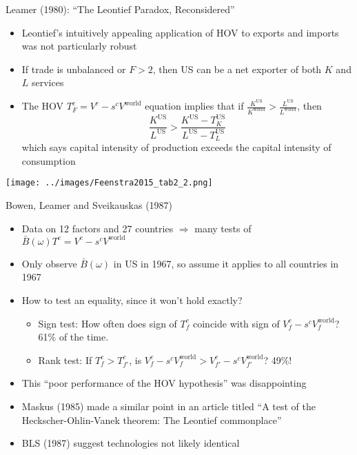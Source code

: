 \documentclass[10pt,notes=hide]{beamer}
\begin{document}
\begin{frame}{Leamer (1980): ``The Leontief Paradox, Reconsidered''}
\begin{itemize}
	\item Leontief's intuitively appealing application of HOV to exports and imports was not particularly robust
	\item If trade is unbalanced or $F>2$, then US can be a net exporter of both $K$ and $L$ services
	\item The HOV $T_{F}^{c} = V^c - s^c V^{\text{world}}$ equation implies that
	if $\frac{K^{\text{US}}}{K^{\text{world}}} > \frac{L^{\text{US}}}{L^{\text{world}}}$, then
	\begin{equation*}
		\frac{K^{\text{US}}}{L^{\text{US}}} > \frac{K^{\text{US}} - T_K^{\text{US}}}{L^{\text{US}} - T_L^{\text{US}}} 
	\end{equation*}
	which says capital intensity of production exceeds the capital intensity of consumption
\end{itemize}
\texttt{[image: ../images/Feenstra2015\_tab2\_2.png]}
\end{frame}
\begin{frame}{Bowen, Leamer and Sveikauskas (1987)}
\begin{itemize}
	\item Data on 12 factors and 27 countries $\Rightarrow$ many tests of $\bar{B}(\omega) T^c  = V^c - s^c V^{\text{world}}$
	\item Only observe $\bar{B}(\omega)$ in US in 1967, so assume it applies to all countries in 1967
	\item How to test an equality, since it won't hold exactly?
	\begin{itemize}
		\item Sign test: How often does sign of $T_{f}^{c}$ coincide with sign of $V_f^c - s^c V_f^{\text{world}}$? 61\% of the time.
		\item Rank test: If $T_{f}^{c} > T_{f'}^{c}$, is $V_{f}^c - s^c V_{f}^{\text{world}} > V_{f'}^c - s^c V_{f'}^{\text{world}}$? 49\%!
	\end{itemize}
	\item This ``poor performance of the HOV hypothesis'' was disappointing
	\item Maskus (1985) made a similar point in an article titled ``A test of the Heckscher-Ohlin-Vanek theorem: The Leontief commonplace''
	\item BLS (1987) suggest technologies not likely identical
\end{itemize}
\end{frame}
\end{document}
